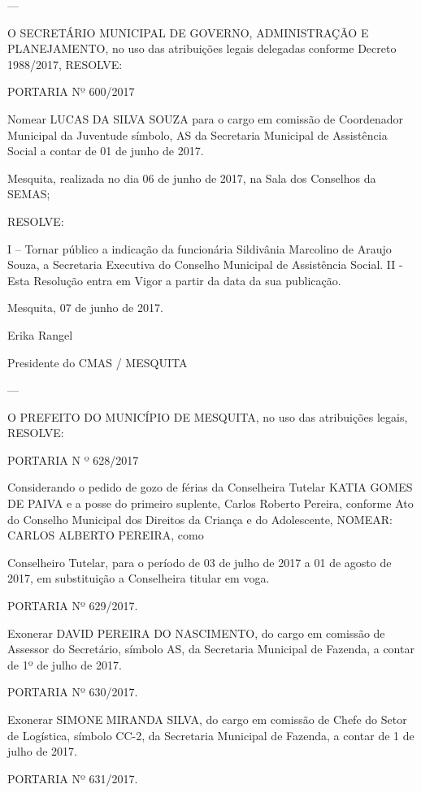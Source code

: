 \documentclass{doliberto}
\begin{document}
---

O  SECRETÁRIO  MUNICIPAL  DE  GOVERNO, 
ADMINISTRAÇÃO E PLANEJAMENTO, no uso das 
atribuições  legais  delegadas  conforme  Decreto 
1988/2017, RESOLVE: 
 
PORTARIA Nº 600/2017 
 
Nomear LUCAS DA SILVA SOUZA para o cargo em 
comissão de Coordenador Municipal da Juventude 
símbolo, AS da Secretaria Municipal de Assistência 
Social a contar de 01 de junho de 2017. 
 

Mesquita, realizada no dia 06 de junho de 2017, na Sala dos 
Conselhos da SEMAS;  
 
RESOLVE: 
 
I  –  Tornar  público  a  indicação  da  funcionária  Sildivânia 
Marcolino  de  Araujo  Souza,  a  Secretaria  Executiva  do 
Conselho Municipal de Assistência Social. 
II  -  Esta  Resolução  entra  em  Vigor  a  partir  da  data  da  sua 
publicação. 

 
Mesquita, 07 de junho de 2017.  

Erika Rangel 

Presidente do CMAS / MESQUITA 

---

O PREFEITO DO MUNICÍPIO DE MESQUITA, no 
uso das atribuições legais,  
RESOLVE:  
 
PORTARIA N º 628/2017 
 
                Considerando  o  pedido  de  gozo  de  férias  da 
Conselheira Tutelar KATIA GOMES DE PAIVA e a posse do 
primeiro suplente, Carlos Roberto Pereira, conforme Ato do 
Conselho  Municipal  dos  Direitos  da  Criança  e  do 
Adolescente, NOMEAR: CARLOS ALBERTO PEREIRA, como 
 

Conselheiro Tutelar, para o período de 03 de julho de 2017 
a  01  de  agosto  de  2017,  em  substituição  a  Conselheira 
titular em voga.  
 
PORTARIA Nº 629/2017. 
 
Exonerar DAVID PEREIRA DO NASCIMENTO, do cargo em 
comissão  de  Assessor  do  Secretário,  símbolo  AS,  da 
Secretaria Municipal de Fazenda, a contar de 1º de julho 
de 2017. 
 
PORTARIA Nº 630/2017. 
 
Exonerar SIMONE MIRANDA SILVA, do cargo em comissão 
de  Chefe  do  Setor  de  Logística,  símbolo  CC-2,  da 
Secretaria  Municipal  de  Fazenda,  a  contar  de  1  de  julho 
de 2017. 
 
PORTARIA Nº 631/2017. 
 
\end{document}
